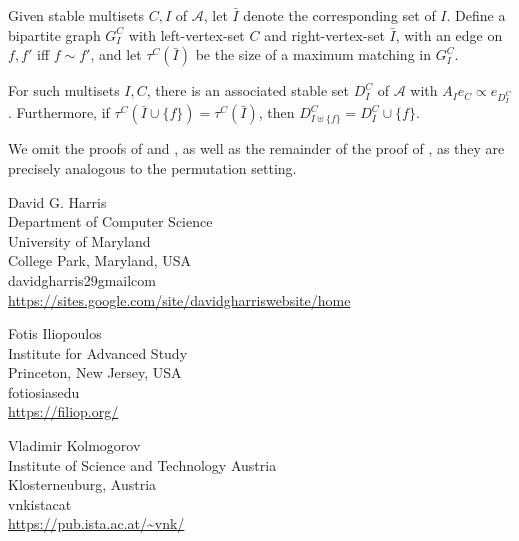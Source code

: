 \documentclass{toc}
\begin{document}
\begin{proposition}
\label{add-active-prop22}
Given stable multisets $C, I$ of $\mathcal A$, let $\bar I$ denote the corresponding set of $I$. Define a bipartite graph $G^C_{I}$ with left-vertex-set $C$ and right-vertex-set  $\bar I$, with an edge on $f, f'$ iff $f \sim f'$, and let $\tau^{C}(\bar I)$ be the size of a maximum matching in $G^C_{I}$.   

For such multisets $I, C$, there is an associated stable set $D^C_{I}$ of $\mathcal A$ with $A_I e_C \propto e_{D^C_{I}}$. Furthermore, if $\tau^C(\bar I \cup \{f \}) = \tau^C(\bar I)$, then $D^C_{I \uplus \{f \}} = D^C_{I} \cup \{ f \}$.
\end{proposition}

We omit the proofs of  and , as well as the remainder of the proof of , as they are precisely analogous to the permutation setting. 


%
%
%
%


%
%
%
%
%
\begin{tocauthors}
\begin{tocinfo}[harris]
David G. Harris \\
 Department of Computer Science \\
 University of Maryland \\
 College Park, Maryland, USA \\
 davidgharris29\tocat{}gmail\tocdot{}com  \\
 \url{https://sites.google.com/site/davidgharriswebsite/home}  %
 \end{tocinfo}
 \begin{tocinfo}[iliopoulos]
 Fotis Iliopoulos \\
 Institute for Advanced Study \\
 Princeton, New Jersey, USA \\
 fotios\tocat{}ias\tocdot{}edu \\
 \url{https://filiop.org/}     %
 \end{tocinfo}
 \begin{tocinfo}[kolmogorov]
 Vladimir Kolmogorov \\
 Institute of Science and Technology Austria \\
 Klosterneuburg, Austria \\
 vnk\tocat{}ist\tocdot{}ac\tocdot{}at  \\
 \url{https://pub.ista.ac.at/~vnk/}      %
\end{tocinfo}
\end{tocauthors}
\end{document}
